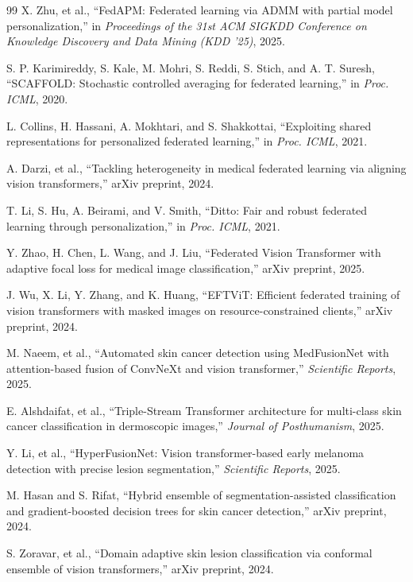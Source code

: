 \documentclass{ieeeaccess}
\begin{document}
\begin{thebibliography}{99}
X. Zhu, et al.,
“FedAPM: Federated learning via ADMM with partial model personalization,”
in \emph{Proceedings of the 31st ACM SIGKDD Conference on Knowledge Discovery and Data Mining (KDD ’25)}, 2025.

S. P. Karimireddy, S. Kale, M. Mohri, S. Reddi, S. Stich, and A. T. Suresh,
“SCAFFOLD: Stochastic controlled averaging for federated learning,”
in \emph{Proc. ICML}, 2020.

L. Collins, H. Hassani, A. Mokhtari, and S. Shakkottai,
“Exploiting shared representations for personalized federated learning,”
in \emph{Proc. ICML}, 2021.

A. Darzi, et al.,
“Tackling heterogeneity in medical federated learning via aligning vision transformers,”
arXiv preprint, 2024.

T. Li, S. Hu, A. Beirami, and V. Smith,
“Ditto: Fair and robust federated learning through personalization,”
in \emph{Proc. ICML}, 2021.

Y. Zhao, H. Chen, L. Wang, and J. Liu,
“Federated Vision Transformer with adaptive focal loss for medical image classification,”
arXiv preprint, 2025.

J. Wu, X. Li, Y. Zhang, and K. Huang,
“EFTViT: Efficient federated training of vision transformers with masked images on resource-constrained clients,”
arXiv preprint, 2024.

M. Naeem, et al.,
“Automated skin cancer detection using MedFusionNet with attention-based fusion of ConvNeXt and vision transformer,”
\emph{Scientific Reports}, 2025.

E. Alshdaifat, et al.,
“Triple-Stream Transformer architecture for multi-class skin cancer classification in dermoscopic images,”
\emph{Journal of Posthumanism}, 2025.

Y. Li, et al.,
“HyperFusionNet: Vision transformer-based early melanoma detection with precise lesion segmentation,”
\emph{Scientific Reports}, 2025.

M. Hasan and S. Rifat,
“Hybrid ensemble of segmentation-assisted classification and gradient-boosted decision trees for skin cancer detection,”
arXiv preprint, 2024.

S. Zoravar, et al.,
“Domain adaptive skin lesion classification via conformal ensemble of vision transformers,”
arXiv preprint, 2024.


\end{thebibliography}
\end{document}
